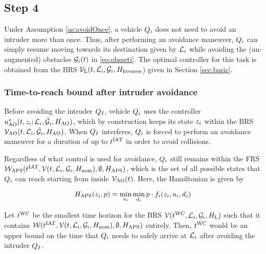 \subsection{Step 4}
Under Assumption \ref{as:avoidOnce}, a vehicle $Q_{i}$ does not need to avoid an intruder more than once. Thus, after performing an avoidance maneuver, $Q_{i}$ can simply resume moving towards its destination given by $\mathcal{L}_i$ while avoiding the (un-augmented) obstacles $\mathcal{G}_i(t)$ in \eqref{eq:obsseti}. The optimal controller for this task is obtained from the BRS $\mathcal{V}_\text{L}(t, \mathcal{L}_i, \mathcal{G}_i, H_\text{liveness}$) given in Section \ref{sec:basic}.

\subsubsection{Time-to-reach bound after intruder avoidance}
Before avoiding the intruder $Q_{I}$, vehicle $Q_{i}$ uses the controller $u^*_\text{AO}(t, z_i; \mathcal{L}_i, \bar{\mathcal{G}}_i, H_\text{AO})$, which by construction keeps its state $z_i$ within the BRS $\mathcal{V}_\text{AO}(t, \mathcal{L}_i, \bar{\mathcal{G}}_i, H_\text{AO})$. When $Q_{I}$ interferes, $Q_{i}$ is forced to perform an avoidance maneuver for a duration of up to $t^\text{IAT}$ in order to avoid collisions. 

Regardless of what control is used for avoidance, $Q_{i}$ still remains within the FRS $\mathcal{W}_\text{APS}(t^\text{IAT}, \mathcal{V}(t, \mathcal{L}_i, \mathcal{G}_i, H_\text{nom}), \emptyset, H_\text{APS})$, which is the set of all possible states that $Q_{i}$ can reach starting from inside $\mathcal{V}_\text{AO}(t)$. Here, the Hamiltonian is given by

\begin{equation}
H_\text{APS}(z_i, p) = \min_{u_i} \min_{d_i} p \cdot f_i (z_i, u_i, d_i)
\end{equation}

Let $t^\text{WC}$ be the smallest time horizon for the BRS $\mathcal{V}(t^\text{WC}, \mathcal{L}_i, \mathcal{G}_i, H_\text{L})$ such that it contains $\mathcal{W}(t^\text{IAT}, \mathcal{V}(t, \mathcal{L}_i, \mathcal{G}_i, H_\text{nom}), \emptyset, H_\text{APS})$ entirely. Then, $t^\text{WC}$ would be an upper bound on the time that $Q_{i}$ needs to safely arrive at $\mathcal{L}_i$ after avoiding the intruder $Q_{I}$.